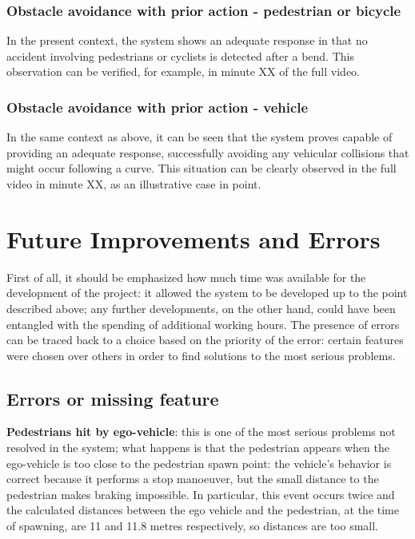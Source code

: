 \documentclass{article}
\begin{document}
\subsubsection{Obstacle avoidance with prior action - pedestrian or bicycle}
In the present context, the system shows an adequate response in that no accident involving pedestrians or cyclists is detected after a bend. This observation can 
be verified, for example, in minute XX of the full video.
\subsubsection{Obstacle avoidance with prior action - vehicle}
In the same context as above, it can be seen that the system proves capable of providing an adequate response, successfully avoiding any vehicular collisions that might 
occur following a curve. This situation can be clearly observed in the full video in minute XX, as an illustrative case in point.

\section{Future Improvements and Errors}
First of all, it should be emphasized how much time was available for the development of the project: it allowed the system to 
be developed up to the point described above; any further developments, on the other hand, could have been entangled with the 
spending of additional working hours. 
The presence of errors can be traced back to a choice based on the priority of the error: certain features were chosen over 
others in order to find solutions to the most serious problems.
\subsection{Errors or missing feature}
\textbf{Pedestrians hit by ego-vehicle}: this is one of the most serious problems not resolved in the system; what 
    happens is that the pedestrian appears when the ego-vehicle is too close to the pedestrian spawn point: the vehicle's behavior 
    is correct because it performs a stop manoeuver, but the small distance to the pedestrian makes braking impossible. 
    In particular, this event occurs twice and the calculated distances between the ego vehicle and the pedestrian, at the time of spawning, 
    are 11 and 11.8 metres respectively, so distances are too small.
\end{document}
